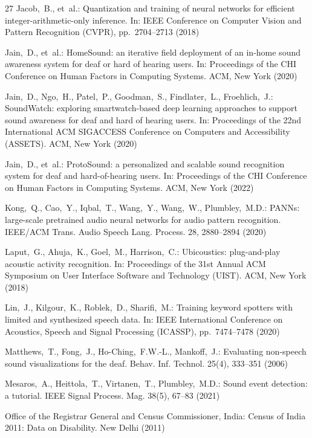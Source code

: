 \documentclass{svproc}
\begin{document}
\begin{thebibliography}{27}
Jacob,~B., et~al.: Quantization and training of neural networks for efficient integer-arithmetic-only inference. In: IEEE Conference on Computer Vision and Pattern Recognition (CVPR), pp.~2704--2713 (2018)

Jain,~D., et~al.: HomeSound: an iterative field deployment of an in-home sound awareness system for deaf or hard of hearing users. In: Proceedings of the CHI Conference on Human Factors in Computing Systems. ACM, New York (2020)

Jain,~D., Ngo,~H., Patel,~P., Goodman,~S., Findlater,~L., Froehlich,~J.: SoundWatch: exploring smartwatch-based deep learning approaches to support sound awareness for deaf and hard of hearing users. In: Proceedings of the 22nd International ACM SIGACCESS Conference on Computers and Accessibility (ASSETS). ACM, New York (2020)

Jain,~D., et~al.: ProtoSound: a personalized and scalable sound recognition system for deaf and hard-of-hearing users. In: Proceedings of the CHI Conference on Human Factors in Computing Systems. ACM, New York (2022)

Kong,~Q., Cao,~Y., Iqbal,~T., Wang,~Y., Wang,~W., Plumbley,~M.D.: PANNs: large-scale pretrained audio neural networks for audio pattern recognition. IEEE/ACM Trans. Audio Speech Lang. Process. 28, 2880--2894 (2020)

Laput,~G., Ahuja,~K., Goel,~M., Harrison,~C.: Ubicoustics: plug-and-play acoustic activity recognition. In: Proceedings of the 31st Annual ACM Symposium on User Interface Software and Technology (UIST). ACM, New York (2018)

Lin,~J., Kilgour,~K., Roblek,~D., Sharifi,~M.: Training keyword spotters with limited and synthesized speech data. In: IEEE International Conference on Acoustics, Speech and Signal Processing (ICASSP), pp.~7474--7478 (2020)

Matthews,~T., Fong,~J., Ho-Ching,~F.W.-L., Mankoff,~J.: Evaluating non-speech sound visualizations for the deaf. Behav. Inf. Technol. 25(4), 333--351 (2006)

Mesaros,~A., Heittola,~T., Virtanen,~T., Plumbley,~M.D.: Sound event detection: a tutorial. IEEE Signal Process. Mag. 38(5), 67--83 (2021)

Office of the Registrar General and Census Commissioner, India: Census of India 2011: Data on Disability. New Delhi (2011)


\end{thebibliography}
\end{document}
